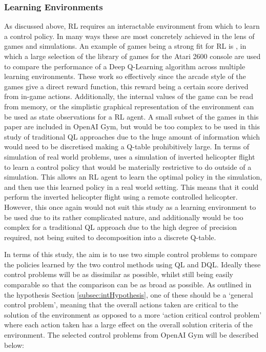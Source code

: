 \documentclass[hidelinks,journal]{IEEEtran}
\begin{document}
\subsubsection{Learning Environments}
As discussed above, RL requires an interactable environment from which to learn a control policy. In many ways these are most concretely achieved in the lens of games and simulations. An example of games being a strong fit for RL is \textcite{Mnih13}, in which a large selection of the library of games for the Atari 2600 console are used to compare the performance of a Deep Q-Learning algorithm across multiple learning environments. These work so effectively since the arcade style of the games give a direct reward function, this reward being a certain score derived from in-game actions. Additionally, the internal values of the game can be read from memory, or the simplistic graphical representation of the environment can be used as state observations for a RL agent. A small subset of the games in this paper are included in OpenAI Gym, but would be too complex to be used in this study of traditional QL approaches due to the huge amount of information which would need to be discretised making a Q-table prohibitively large. In terms of simulation of real world problems, \textcite{Ng06} uses a simulation of inverted helicopter flight to learn a control policy that would be materially restrictive to do outside of a simulation. This allows an RL agent to learn the optimal policy in the simulation, and then use this learned policy in a real world setting. This means that it could perform the inverted helicopter flight using a remote controlled helicopter. However, this once again would not suit this study as a learning environment to be used due to its rather complicated nature, and additionally would be too complex for a traditional QL approach due to the high degree of precision required, not being suited to decomposition into a discrete Q-table.

In terms of this study, the aim is to use two simple control problems to compare the policies learned by the two control methods using QL and DQL. Ideally these control problems will be as dissimilar as possible, whilst still being easily comparable so that the comparison can be as broad as possible. As outlined in the hypothesis Section \ref{subsec:intHypothesis}, one of these should be a ‘general control problem’, meaning that the overall actions taken are critical to the solution of the environment as opposed to a more ‘action critical control problem’ where each action taken has a large effect on the overall solution criteria of the environment. The selected control problems from OpenAI Gym will be described below:
\end{document}

